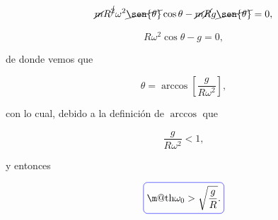 \documentclass[a4paper,10pt]{article}
\makeatletter
\numberwithin{equation}{section}
\newcommand*{\boxcolor}{blue}
\renewcommand{\boxed}[1]{\textcolor{\boxcolor}{%
\tikz[baseline={([yshift=-1ex]current bounding box.center)}] \node [rectangle, minimum width=1ex,rounded corners,draw] {\normalcolor\m@th$\displaystyle#1$};}}
\makeatother
\begin{document}
\begin{equation}
 \cancel{m}R^{\cancel{2}}\omega^2\cancel{\sen{\theta}}\cos{\theta} - \cancel{m}\cancel{R} 
 g\cancel{\sen{\theta}} = 0,
\end{equation}

\begin{equation}
 R\omega^2\cos{\theta} - g = 0,
\end{equation}

de donde vemos que 

\begin{equation}
 \theta = \arccos{\left[\frac{g}{R\omega^2}\right]},
\end{equation}

con lo cual, debido a la definición de $\arccos$ que 

\begin{equation}
 \frac{g}{R\omega^2} < 1,
\end{equation}

y entonces 

\begin{equation}
 \boxed{\omega_0 > \sqrt{\frac{g}{R}}.}
\end{equation}
\end{document}
